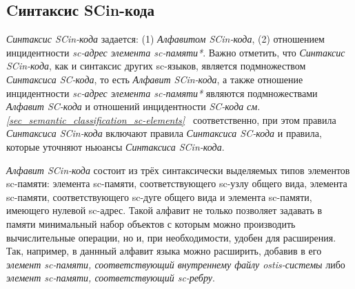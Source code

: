 \subsection{Cинтаксис SCin-кода}
\label{sec_soft_platform_scin_code_alphabet_and_syntax}

\textit{Синтаксис SCin-кода} задается: (1) \textit{Алфавитом SCin-кода}, (2) отношением инцидентности \textit{sc-адрес элемента sc-памяти*}. Важно отметить, что \textit{Синтаксис SCin-кода}, как и синтаксис других sc-языков, является подмножеством \textit{Синтаксиса SC-кода}, то есть \textit{Алфавит SCin-кода\scnsupergroupsign}, а также отношение инцидентности \textit{sc-адрес элемента sc-памяти*} являются подмножествами \textit{Алфавит SC-кода\scnsupergroupsign} и отношений инцидентности \textit{SC-кода} \textit{см. \ref{sec_semantic_classification_sc-elements}~} соответственно, при этом правила \textit{Синтаксиса SCin-кода} включают правила \textit{Синтаксиса SC-кода} и правила, которые уточняют ньюансы \textit{Синтаксиса SCin-кода}.

\begin{SCn}
\begin{scneqtoset}
    \begin{scnindent}
    \end{scnindent}
\end{scneqtoset}
\end{SCn}

\textit{Алфавит SCin-кода\scnsupergroupsign} состоит из трёх синтаксически выделяемых типов элементов sc-памяти: элемента sc-памяти, соответствующего sc-узлу общего вида, элемента sc-памяти, соответствующего sc-дуге общего вида и элемента sc-памяти, имеющего нулевой sc-адрес. Такой алфавит не только позволяет задавать в памяти минимальный набор объектов с которым можно производить вычислительные операции, но и, при необходимости, удобен для расширения. Так, например, в даннный алфавит языка можно расширить, добавив в его \textit{элемент sc-памяти, соответствующий внутреннему файлу ostis-системы} либо \textit{элемент sc-памяти, соответствующий sc-ребру}.

\begin{SCn}
\end{SCn}

